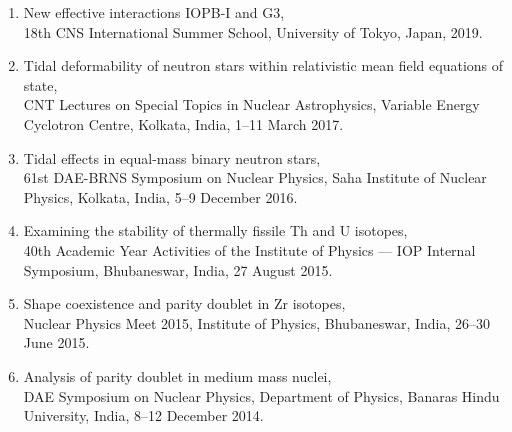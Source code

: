 \begin{enumerate}
\item New effective interactions IOPB-I and G3, \\
18th CNS International Summer School, University of Tokyo, Japan, 2019.

\item Tidal deformability of neutron stars within relativistic mean field
equations of state, \\
CNT Lectures on Special Topics in Nuclear Astrophysics, Variable Energy
Cyclotron Centre, Kolkata, India, 1--11 March 2017.

\item Tidal effects in equal-mass binary neutron stars, \\
61st DAE-BRNS Symposium on Nuclear Physics, Saha Institute of Nuclear Physics,
Kolkata, India, 5--9 December 2016.

\item Examining the stability of thermally fissile Th and U isotopes, \\
40th Academic Year Activities of the Institute of Physics --- IOP Internal
Symposium, Bhubaneswar, India, 27 August 2015.

\item Shape coexistence and parity doublet in Zr isotopes, \\
Nuclear Physics Meet 2015, Institute of Physics, Bhubaneswar, India,
26--30 June 2015.

\item Analysis of parity doublet in medium mass nuclei, \\
DAE Symposium on Nuclear Physics, Department of Physics, Banaras Hindu
University, India, 8--12 December 2014.
\end{enumerate}
